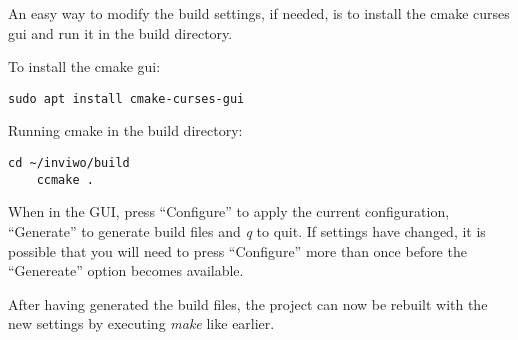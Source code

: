 An easy way to modify the build settings, if needed, is to install
the cmake curses gui and run it in the build directory.

To install the cmake gui:
\begin{lstlisting}[frame = single, breaklines = true]
    sudo apt install cmake-curses-gui
\end{lstlisting}

Running cmake in the build directory:
\begin{lstlisting}[frame = single, breaklines = true]
    cd ~/inviwo/build
    ccmake .
\end{lstlisting}

When in the GUI, press ``Configure'' to apply the current configuration, ``Generate'' to generate build files and \emph{q} to quit. If settings have changed, it is possible that you will need to press ``Configure'' more
than once before the ``Genereate'' option becomes available.

After having generated the build files, the project can now be rebuilt with the new settings by executing \emph{make} like earlier.